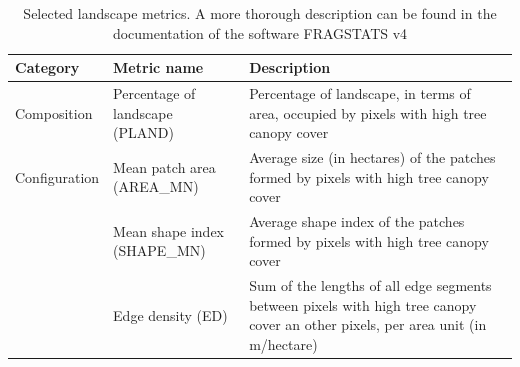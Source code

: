 \documentclass[10pt,letterpaper]{article}
\begin{document}
\begin{table}[!h]
  \begin{adjustwidth}{-.4\textwidth}{0cm} %
    \caption{\label{tab:selected-metrics}Selected landscape metrics. A more thorough description can be found in the documentation of the software FRAGSTATS v4 \cite{mcgarigal2012fragstats}}
    \renewcommand{\arraystretch}{1.5} %
    \begin{center}
      \begin{tabular}{p{} p{} p{}} 
        \toprule
        \textbf{Category} & \textbf{Metric name} & \textbf{Description} \\
        \midrule
        Composition & Percentage of landscape (PLAND) & Percentage of landscape, in terms of area, occupied by pixels with high tree canopy cover \\
        Configuration & Mean patch area (AREA\_MN) & Average size (in hectares) of the patches formed by pixels with high tree canopy cover \\
        & Mean shape index (SHAPE\_MN) & Average shape index of the patches formed by pixels with high tree canopy cover \\
        & Edge density (ED) & Sum of the lengths of all edge segments between pixels with high tree canopy cover an other pixels, per area unit (in m/hectare) \\    
        \bottomrule  
      \end{tabular}
    \end{center}
  \end{adjustwidth}
\end{table}

\end{document}
